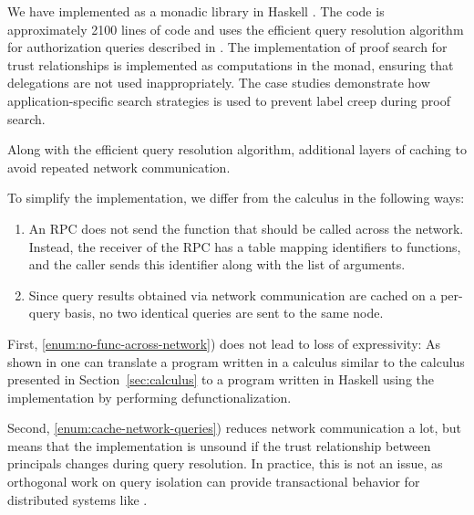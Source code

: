 We have implemented \lang{} as a monadic library in Haskell \cite{flamiolib}. The code is approximately 2100 lines of code and uses the efficient query resolution algorithm for authorization queries described in \cite{Arden:2015:FA:2859845.2859998}. The implementation of proof search for trust relationships is implemented as computations in the \lang{} monad, ensuring that delegations are not used inappropriately. The case studies demonstrate how application-specific search strategies is used to prevent label creep during proof search.

Along with the efficient query resolution algorithm, additional layers of caching to avoid repeated network communication. %

To simplify the implementation, we differ from the calculus in the following ways:
\begin{enumerate}
    \item \label{enum:no-func-across-network} An RPC does not send the function that should be called across the network. Instead, the receiver of the RPC has a table mapping identifiers to functions, and the caller sends this identifier along with the list of arguments.
    \item \label{enum:cache-network-queries} Since query results obtained via network communication are cached on a per-query basis, no two identical queries are sent to the same node.
\end{enumerate}

First, \ref{enum:no-func-across-network}) does not lead to loss of expressivity:  As shown in \cite{Cooper:2009:RC:1599410.1599439} one can translate a program written in a calculus similar to the calculus presented in Section~\ref{sec:calculus} to a program written in Haskell using the \lang{} implementation by performing defunctionalization.

Second, \ref{enum:cache-network-queries}) reduces network communication a lot, but means that the implementation is unsound if the trust relationship between principals changes during query resolution. In practice, this is not an issue, as orthogonal work on query isolation \cite{Liu:2009:FPS:1629575.1629606} can provide transactional behavior for distributed systems like \lang.

